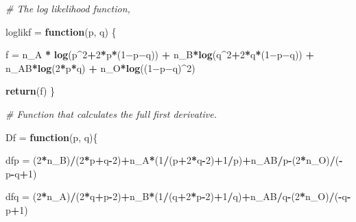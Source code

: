 \documentclass[]{article}
\newenvironment{Shaded}{\begin{snugshade}}{\end{snugshade}}
\newcommand{\KeywordTok}[1]{\textcolor[rgb]{0.13,0.29,0.53}{\textbf{#1}}}
\newcommand{\DecValTok}[1]{\textcolor[rgb]{0.00,0.00,0.81}{#1}}
\newcommand{\StringTok}[1]{\textcolor[rgb]{0.31,0.60,0.02}{#1}}
\newcommand{\CommentTok}[1]{\textcolor[rgb]{0.56,0.35,0.01}{\textit{#1}}}
\newcommand{\ControlFlowTok}[1]{\textcolor[rgb]{0.13,0.29,0.53}{\textbf{#1}}}
\newcommand{\OperatorTok}[1]{\textcolor[rgb]{0.81,0.36,0.00}{\textbf{#1}}}
\newcommand{\NormalTok}[1]{#1}
\begin{document}
\begin{Shaded}
\begin{Highlighting}[]
\CommentTok{# The log likelihood function,}

\NormalTok{loglikf =}\StringTok{ }\ControlFlowTok{function}\NormalTok{(p, q) \{}

\NormalTok{  f =}\StringTok{ }\NormalTok{n_A }\OperatorTok{*}\StringTok{ }\KeywordTok{log}\NormalTok{(p}\OperatorTok{^}\DecValTok{2}\OperatorTok{+}\DecValTok{2}\OperatorTok{*}\NormalTok{p}\OperatorTok{*}\NormalTok{(}\DecValTok{1}\NormalTok{−p−q)) }\OperatorTok{+}\StringTok{ }\NormalTok{n_B}\OperatorTok{*}\KeywordTok{log}\NormalTok{(q}\OperatorTok{^}\DecValTok{2}\OperatorTok{+}\DecValTok{2}\OperatorTok{*}\NormalTok{q}\OperatorTok{*}\NormalTok{(}\DecValTok{1}\NormalTok{−p−q)) }\OperatorTok{+}\StringTok{ }\NormalTok{n_AB}\OperatorTok{*}\KeywordTok{log}\NormalTok{(}\DecValTok{2}\OperatorTok{*}\NormalTok{p}\OperatorTok{*}\NormalTok{q) }\OperatorTok{+}\StringTok{ }\NormalTok{n_O}\OperatorTok{*}\KeywordTok{log}\NormalTok{((}\DecValTok{1}\NormalTok{−p−q)}\OperatorTok{^}\DecValTok{2}\NormalTok{)}

  \KeywordTok{return}\NormalTok{(f)}
\NormalTok{\}}

\CommentTok{# Function that calculates the full first derivative. }

\NormalTok{Df =}\StringTok{ }\ControlFlowTok{function}\NormalTok{(p, q)\{}
  
\NormalTok{  dfp =}\StringTok{ }\NormalTok{(}\DecValTok{2}\OperatorTok{*}\NormalTok{n_B)}\OperatorTok{/}\NormalTok{(}\DecValTok{2}\OperatorTok{*}\NormalTok{p}\OperatorTok{+}\NormalTok{q}\OperatorTok{-}\DecValTok{2}\NormalTok{)}\OperatorTok{+}\NormalTok{n_A}\OperatorTok{*}\NormalTok{(}\DecValTok{1}\OperatorTok{/}\NormalTok{(p}\OperatorTok{+}\DecValTok{2}\OperatorTok{*}\NormalTok{q}\OperatorTok{-}\DecValTok{2}\NormalTok{)}\OperatorTok{+}\DecValTok{1}\OperatorTok{/}\NormalTok{p)}\OperatorTok{+}\NormalTok{n_AB}\OperatorTok{/}\NormalTok{p}\OperatorTok{-}\NormalTok{(}\DecValTok{2}\OperatorTok{*}\NormalTok{n_O)}\OperatorTok{/}\NormalTok{(}\OperatorTok{-}\NormalTok{p}\OperatorTok{-}\NormalTok{q}\OperatorTok{+}\DecValTok{1}\NormalTok{)}
  
\NormalTok{  dfq =}\StringTok{ }\NormalTok{(}\DecValTok{2}\OperatorTok{*}\NormalTok{n_A)}\OperatorTok{/}\NormalTok{(}\DecValTok{2}\OperatorTok{*}\NormalTok{q}\OperatorTok{+}\NormalTok{p}\OperatorTok{-}\DecValTok{2}\NormalTok{)}\OperatorTok{+}\NormalTok{n_B}\OperatorTok{*}\NormalTok{(}\DecValTok{1}\OperatorTok{/}\NormalTok{(q}\OperatorTok{+}\DecValTok{2}\OperatorTok{*}\NormalTok{p}\OperatorTok{-}\DecValTok{2}\NormalTok{)}\OperatorTok{+}\DecValTok{1}\OperatorTok{/}\NormalTok{q)}\OperatorTok{+}\NormalTok{n_AB}\OperatorTok{/}\NormalTok{q}\OperatorTok{-}\NormalTok{(}\DecValTok{2}\OperatorTok{*}\NormalTok{n_O)}\OperatorTok{/}\NormalTok{(}\OperatorTok{-}\NormalTok{q}\OperatorTok{-}\NormalTok{p}\OperatorTok{+}\DecValTok{1}\NormalTok{)}
  

\end{Highlighting}
\end{Shaded}
\end{document}
